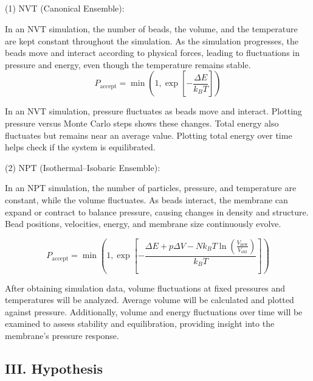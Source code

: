 \documentclass[12pt]{article}
\begin{document}
\begin{flushleft}
\subsection*{}

(1) NVT (Canonical Ensemble): 

In an NVT simulation, the number of beads, the volume, and the temperature are kept constant throughout the simulation.  As the simulation progresses, the beads move and interact according to physical forces, leading to fluctuations in pressure and energy, even though the temperature remains stable. 
\begin{equation}
P_{\text{accept}} = \min \left( 1, \exp\left[-\frac{\Delta E}{k_B T}\right] \right)
\end{equation}

In an NVT simulation, pressure fluctuates as beads move and interact. Plotting pressure versus Monte Carlo steps shows these changes. Total energy also fluctuates but remains near an average value. Plotting total energy over time helps check if the system is equilibrated.
   
   

(2) NPT (Isothermal–Isobaric Ensemble): 

In an NPT simulation, the number of particles, pressure, and temperature are constant, while the volume fluctuates. As beads interact, the membrane can expand or contract to balance pressure, causing changes in density and structure. Bead positions, velocities, energy, and membrane size continuously evolve.
        
\begin{equation}
P_{\text{accept}} = \min \left( 1, \exp \left[ - \frac{\Delta E + p \Delta V - N k_B T \ln \left( \frac{V_{\text{new}}}{V_{\text{old}}} \right)}{k_B T} \right] \right)
\end{equation}
 
After obtaining simulation data, volume fluctuations at fixed pressures and temperatures will be analyzed. Average volume will be calculated and plotted against pressure. Additionally, volume and energy fluctuations over time will be examined to assess stability and equilibration, providing insight into the membrane’s pressure response. 



\vspace{-1em}
\subsection*{III. Hypothesis}



\end{flushleft}
\end{document}
